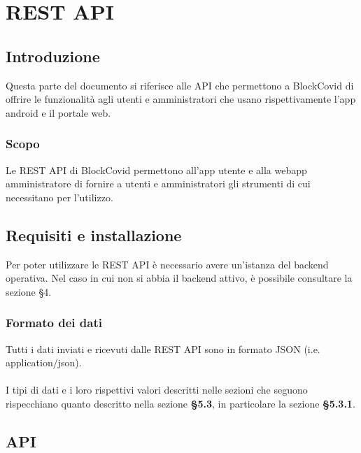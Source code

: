 \section{REST API}
\subsection{Introduzione}
Questa parte del documento si riferisce alle API che permettono a BlockCovid di offrire le funzionalità agli utenti e amministratori che usano rispettivamente l'app android e il portale web.

\subsubsection{Scopo}
Le REST API di BlockCovid permettono all'app utente e alla webapp amministratore di fornire a utenti e amministratori gli strumenti di cui necessitano per l'utilizzo.

\subsection{Requisiti e installazione}
Per poter utilizzare le REST API è necessario avere un'istanza del backend operativa. Nel caso in cui non si abbia il backend attivo, è possibile consultare la sezione §4.

\subsubsection{Formato dei dati}
Tutti i dati inviati e ricevuti dalle REST API sono in formato JSON (i.e. application/json).\\\\
I tipi di dati e i loro rispettivi valori descritti nelle sezioni che seguono rispecchiano quanto descritto nella sezione \textbf{§5.3}, in particolare la sezione \textbf{§5.3.1}.

\subsection{API}
